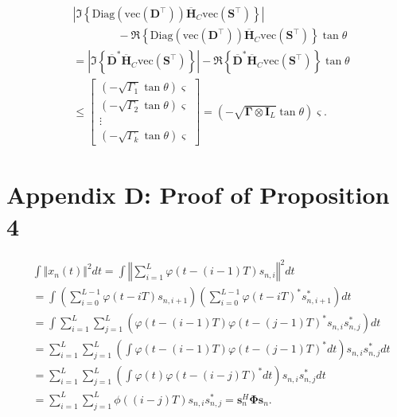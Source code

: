 \begin{equation}
\begin{aligned}
    &\left|\Im\left\{\text{Diag}(\text{vec}(\mathbf{D}^{\top}))\overline{\mathbf{H}}_C\text{vec}(\mathbf{S}^{\top}) \right\}\right| \\ &\qquad\qquad- \Re\left\{\text{Diag}(\text{vec}(\mathbf{D}^{\top}))\overline{\mathbf{H}}_C\text{vec}(\mathbf{S}^{\top}) \right\}\tan\theta \\
    &=\left| \Im\left\{\overline{\mathbf{D}}^{*}\overline{\mathbf{H}}_C\text{vec}(\mathbf{S}^{\top})\right\} \right| - \Re\left\{\overline{\mathbf{D}}^{*}\overline{\mathbf{H}}_C\text{vec}(\mathbf{S}^{\top})\right\}\tan\theta \\
    &\leq
    \begin{bmatrix}
        (-\sqrt{\Gamma_1}\tan\theta)\bm{\varsigma} \\
        (-\sqrt{\Gamma_2}\tan\theta)\bm{\varsigma} \\
        \vdots \\
        (-\sqrt{\Gamma_k}\tan\theta)\bm{\varsigma}
    \end{bmatrix}
    =(-\sqrt{\mathbf{\Gamma}\otimes\mathbf{I}_L}\tan\theta)\bm{\varsigma}.
\end{aligned}
\end{equation}


\section*{Appendix D: Proof of Proposition 4}
\label{app:prop4}
\begin{equation}
\begin{aligned}
    &\int\Vert x_n(t)\Vert^2 dt = \int\left\Vert\sum_{i=1}^{L}\varphi(t-(i-1)T)s_{n,i}\right\Vert^2 dt \\
    &=\int\left(\sum_{i=0}^{L-1}\varphi(t-iT)s_{n,i+1}\right)\left(\sum_{i=0}^{L-1}\varphi(t-iT)^*s_{n,i+1}^*\right) dt \\
    &=\int\sum_{i=1}^{L}\sum_{j=1}^{L}\left(\varphi(t-(i-1)T)\varphi(t-(j-1)T)^*s_{n,i}s_{n,j}^*\right) dt \\
    &=\sum_{i=1}^{L}\sum_{j=1}^{L}\left(\int\varphi(t-(i-1)T)\varphi(t-(j-1)T)^*dt\right)s_{n,i}s_{n,j}^* dt\\
    &=\sum_{i=1}^{L}\sum_{j=1}^{L}\left(\int\varphi(t)\varphi(t-(i-j)T)^*dt\right)s_{n,i}s_{n,j}^* dt\\
    &=\sum_{i=1}^{L}\sum_{j=1}^{L}\phi((i-j)T)s_{n,i}s_{n,j}^* = \mathbf{s}_n^{H}\mathbf{\Phi}\mathbf{s}_n.
\end{aligned}
\end{equation}

